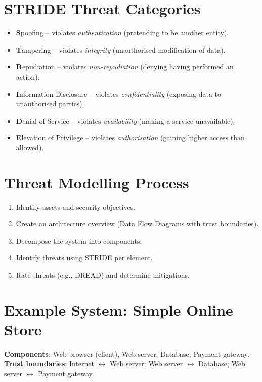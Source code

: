 \documentclass[10pt,a4paper]{article}
\begin{document}
\section*{STRIDE Threat Categories}
\begin{itemize}
    \item \textbf{S}poofing -- violates \emph{authentication} (pretending to be another entity).
    \item \textbf{T}ampering -- violates \emph{integrity} (unauthorised modification of data).
    \item \textbf{R}epudiation -- violates \emph{non-repudiation} (denying having performed an action).
    \item \textbf{I}nformation Disclosure -- violates \emph{confidentiality} (exposing data to unauthorised parties).
    \item \textbf{D}enial of Service -- violates \emph{availability} (making a service unavailable).
    \item \textbf{E}levation of Privilege -- violates \emph{authorisation} (gaining higher access than allowed).
\end{itemize}

\section*{Threat Modelling Process}
\begin{enumerate}
    \item Identify assets and security objectives.
    \item Create an architecture overview (Data Flow Diagrams with trust boundaries).
    \item Decompose the system into components.
    \item Identify threats using STRIDE per element.
    \item Rate threats (e.g., DREAD) and determine mitigations.
\end{enumerate}

\section*{Example System: Simple Online Store}
\textbf{Components}: Web browser (client), Web server, Database, Payment gateway.\\
\textbf{Trust boundaries}: Internet $\leftrightarrow$ Web server; Web server $\leftrightarrow$ Database; Web server $\leftrightarrow$ Payment gateway.
\end{document}
